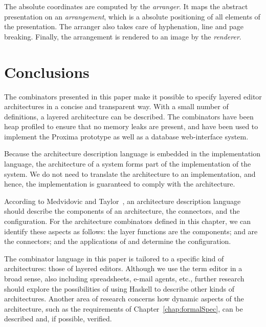 The absolute coordinates are computed by the {\em arranger}. It maps the abstract presentation on an {\em arrangement}, which is a absolute positioning of all elements of the presentation. The arranger also takes care of hyphenation, line and page breaking. Finally, the arrangement is rendered to an image by the {\em renderer}.
\ec


%																
%																
%																
\section{Conclusions} \label{sect:haskellconclusions}

The combinators presented in this paper make it possible to specify layered editor architectures in a concise and transparent way. With a small number of definitions, a layered architecture can be described. The combinators have been heap profiled to ensure that no memory leaks are present, and have been used to implement the Proxima prototype as well as a database web-interface system.

Because the architecture description language is embedded in the implementation language, the architecture of a system forms part of the implementation of the system. We do not need to translate the architecture to an implementation, and hence, the implementation is guaranteed to comply with the architecture.

According to Medvidovic and Taylor~\cite{medvidovic00ADLs}, an architecture description language should describe the components of an architecture, the connectors, and the configuration. For the architecture combinators defined in this chapter, we can identify these aspects as follows: the layer functions are the components;  and  are the connectors; and the applications of  and  determine the configuration.

The combinator language in this paper is tailored to a specific kind of architectures: those of layered editors. Although we use the term editor in a broad sense, also including spreadsheets, e-mail agents, etc., further research should explore the possibilities of using Haskell to describe other kinds of architectures. Another area of research concerns how dynamic aspects of the architecture, such as the requirements of Chapter~\ref{chap:formalSpec}, can be described and, if possible, verified.

